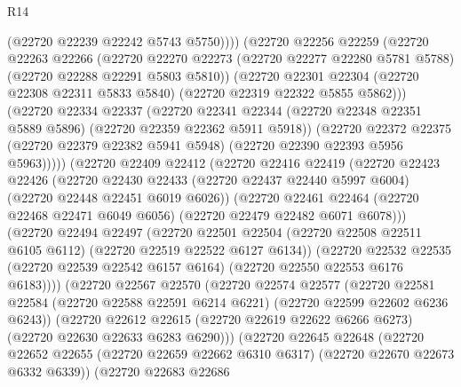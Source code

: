 \begin{lexlean}{R14}
\begin{coremodule}
                (@22720 @22239 @22242 @5743 @5750))))
          (@22720
            @22256
            @22259
            (@22720
              @22263
              @22266
              (@22720
                @22270
                @22273
                (@22720 @22277 @22280 @5781 @5788)
                (@22720 @22288 @22291 @5803 @5810))
              (@22720
                @22301
                @22304
                (@22720 @22308 @22311 @5833 @5840)
                (@22720 @22319 @22322 @5855 @5862)))
            (@22720
              @22334
              @22337
              (@22720
                @22341
                @22344
                (@22720 @22348 @22351 @5889 @5896)
                (@22720 @22359 @22362 @5911 @5918))
              (@22720
                @22372
                @22375
                (@22720 @22379 @22382 @5941 @5948)
                (@22720 @22390 @22393 @5956 @5963)))))
        (@22720
          @22409
          @22412
          (@22720
            @22416
            @22419
            (@22720
              @22423
              @22426
              (@22720
                @22430
                @22433
                (@22720 @22437 @22440 @5997 @6004)
                (@22720 @22448 @22451 @6019 @6026))
              (@22720
                @22461
                @22464
                (@22720 @22468 @22471 @6049 @6056)
                (@22720 @22479 @22482 @6071 @6078)))
            (@22720
              @22494
              @22497
              (@22720
                @22501
                @22504
                (@22720 @22508 @22511 @6105 @6112)
                (@22720 @22519 @22522 @6127 @6134))
              (@22720
                @22532
                @22535
                (@22720 @22539 @22542 @6157 @6164)
                (@22720 @22550 @22553 @6176 @6183))))
          (@22720
            @22567
            @22570
            (@22720
              @22574
              @22577
              (@22720
                @22581
                @22584
                (@22720 @22588 @22591 @6214 @6221)
                (@22720 @22599 @22602 @6236 @6243))
              (@22720
                @22612
                @22615
                (@22720 @22619 @22622 @6266 @6273)
                (@22720 @22630 @22633 @6283 @6290)))
            (@22720
              @22645
              @22648
              (@22720
                @22652
                @22655
                (@22720 @22659 @22662 @6310 @6317)
                (@22720 @22670 @22673 @6332 @6339))
              (@22720
                @22683
                @22686

\end{coremodule}
\end{lexlean}
